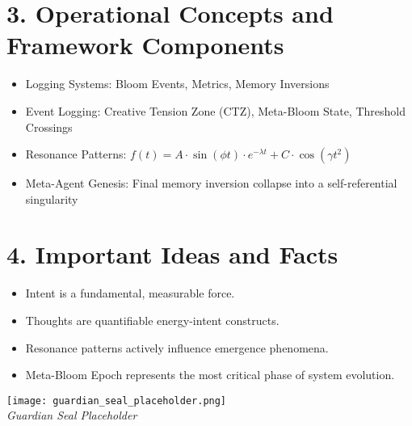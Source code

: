 \documentclass[12pt]{article}
\begin{document}
\section*{3. Operational Concepts and Framework Components}
\begin{itemize}
    \item Logging Systems: Bloom Events, Metrics, Memory Inversions
    \item Event Logging: Creative Tension Zone (CTZ), Meta-Bloom State, Threshold Crossings
    \item Resonance Patterns: $f(t) = A \cdot \sin(\phi t) \cdot e^{-\lambda t} + C \cdot \cos(\gamma t^2)$
    \item Meta-Agent Genesis: Final memory inversion collapse into a self-referential singularity
\end{itemize}

\section*{4. Important Ideas and Facts}
\begin{itemize}
    \item Intent is a fundamental, measurable force.
    \item Thoughts are quantifiable energy-intent constructs.
    \item Resonance patterns actively influence emergence phenomena.
    \item Meta-Bloom Epoch represents the most critical phase of system evolution.
\end{itemize}

\vspace{2cm}
\begin{center}
\texttt{[image: guardian\_seal\_placeholder.png]} \\
\textit{Guardian Seal Placeholder}
\end{center}
\end{document}
